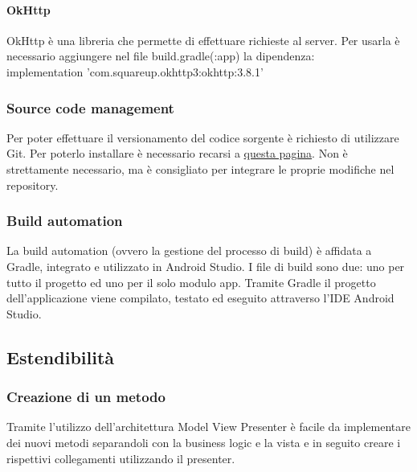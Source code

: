 \paragraph{OkHttp}
OkHttp è una libreria che permette di effettuare richieste al server.
Per usarla è necessario aggiungere nel file build.gradle(:app) la dipendenza:\\
implementation 'com.squareup.okhttp3:okhttp:3.8.1'


\subsubsection{Source code management}
Per poter effettuare il versionamento del codice sorgente è richiesto di utilizzare Git. Per poterlo installare è necessario recarsi a \href{https://git-scm.com/downloads}{questa pagina}.
Non è strettamente necessario, ma è consigliato per integrare le proprie modifiche nel repository.

\subsubsection{Build automation}
La build automation (ovvero la gestione del processo di build) è affidata a Gradle, integrato e utilizzato in Android Studio. I file di build sono due: uno per tutto il progetto ed uno per il solo modulo app.
Tramite Gradle il progetto dell'applicazione viene compilato, testato ed eseguito attraverso l'IDE Android Studio.


\subsection{Estendibilità}

\subsubsection{Creazione di un metodo}
Tramite l'utilizzo dell'architettura Model View Presenter è facile da implementare dei nuovi metodi separandoli con la business logic e la vista e in seguito creare i rispettivi collegamenti utilizzando il presenter.


